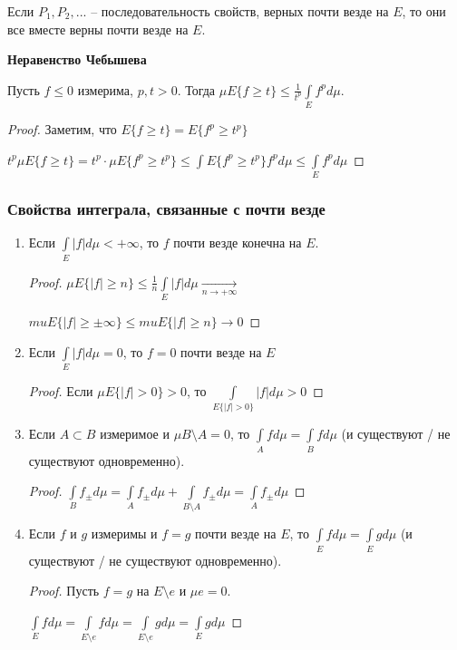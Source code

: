 \begin{remark}
    Если $P_1, P_2,...$ – последовательность свойств, верных почти везде на $E$, то они
    все вместе верны почти везде на $E$.
\end{remark}

\begin{theorem}
    \textbf{Неравенство Чебышева}

    Пусть $f\leq 0$ измерима, $p, t> 0$. Тогда $\mu E\{f\geq t\}\leq \frac{1}{t^p}
    \int\limits_Ef^p d\mu$.
\end{theorem}

\begin{proof}
    Заметим, что $E\{f\geq t\}=E\{f^p \geq t^p\}$

    $t^p\mu E\{f\geq t\}=t^p\cdot \mu E\{f^p\geq t^p\}\leq \int\limits{E\{f^p\geq t^p\}} f^p d\mu 
    \leq \int\limits_E f^pd\mu$
\end{proof}

\subsubsection*{Свойства интеграла, связанные с почти везде}

\begin{enumerate}
    \item Если $\int\limits_E |f| d\mu <+\infty$, то $f$ почти везде конечна на $E$.
    
    \begin{proof}
        $\mu E\{|f|\geq n\}\leq \frac{1}{n}\int\limits_E |f|d\mu \underset
        {n\rightarrow +\infty}{\rightarrow}$

        $mu E\{|f|\geq \pm \infty\}\leq mu E\{|f|\geq n\}\rightarrow 0$
    \end{proof}

    \item Если $\int\limits_E |f| d\mu=0$, то $f=0$ почти везде на $E$
    \begin{proof}
        Если $\mu E\{|f|>0\}>0$, то $\int\limits_{E\{|f|>0\}} |f| d\mu > 0$
    \end{proof}

    \item Если $A\subset B$ измеримое и $\mu B\setminus A=0$, то $\int\limits_A f d\mu=\int\limits_B f d\mu$
    (и существуют / не существуют одновременно).

    \begin{proof}
        $\int\limits_B f_\pm d\mu=\int\limits_A f_\pm d\mu+\int\limits_{B\setminus A} f_\pm d\mu=\int\limits_A f_\pm d\mu$
    \end{proof}

    \item Если $f$ и $g$ измеримы и $f=g$ почти везде на $E$, то $\int\limits_E fd\mu = \int\limits_E gd\mu$
    (и существуют / не существуют одновременно).

    \begin{proof}
        Пусть $f=g$ на $E\setminus e$ и $\mu e=0$.

        $\int\limits_E f d\mu=\int\limits_{E\setminus e} f d\mu = \int\limits_{E\setminus e} gd\mu = \int\limits_E g d\mu$
    \end{proof}
\end{enumerate}

